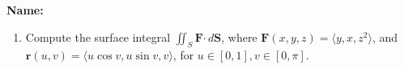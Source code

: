 \documentclass[12pt]{article}
\newcommand{\di}{\displaystyle}
\newcommand{\F}{\mathbf{F}}
\renewcommand{\r}{\mathbf{r}}
\newcommand{\dotp}{\boldsymbol{\cdot}}
\begin{document}
{\bf \Large Name:}
\thispagestyle{fancy}

\bigskip

\begin{enumerate}

 \item Compute the surface integral $\di \iint_S\F\dotp\,d\mathbf{S}$, where $\F(x,y,z) = \langle y, x, z^2\rangle$, and\\ $\r(u,v) = \langle u\cos v, u\sin v, v\rangle$, for $u\in [0,1], v\in [0,\pi]$.
\end{enumerate}
\end{document}
